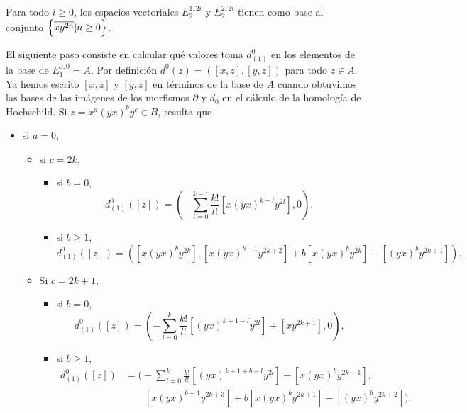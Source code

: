 \documentclass[fleqn,../tesis.tex]{subfiles}
\begin{document}
\begin{coro}
    Para todo $i \geq 0$, los espacios vectoriales $E_{2}^{1, 2i}$ y $E_{2}^{2, 2i}$ tienen como base
    al conjunto
       $\left\lbrace \overline{xy^{2n}} | n \geq 0 \right\rbrace$.
\end{coro}

El siguiente paso consiste en calcular qué valores toma $d_{(1)}^{0}$ en los elementos de la base de $E^{0, 0}_{1} = A$.
Por definición $d^{0}(z) = \left([x,z], [y,z]\right)$ para todo $z \in A$. Ya hemos escrito $[x, z]$ y $[y, z]$ en términos de la base de $A$
 cuando obtuvimos las bases de las imágenes de los morfismos $\partial$ y $d_0$ en el cálculo
de la homología de Hochschild. Si $z  = x^a(yx)^by^c\in B$, resulta que
\begin{itemize}
    \item si $a = 0$,
    \begin{itemize}
        \item si $c = 2k$,
        \begin{itemize}
            \item si $b = 0$,
            \[
                d^{0}_{(1)}([z]) = \left(-\sum_{l = 0}^{k -1}\frac{k!}{l!}\left[x(yx)^{k - l}y^{2l}\right], 0\right),
            \]
            \item si $b \geq 1$,
            \[
                d^0_{(1)}([z]) = \left(\left[x(yx)^by^{2k}\right],\left[x(yx)^{b - 1}y^{2k + 2}\right]
                    + b\left[x(yx)^{b}y^{2k}\right] - \left[(yx)^{b}y^{2k + 1}\right]\right).
            \]
        \end{itemize}
        \item Si $c = 2k + 1$,
        \begin{itemize}
            \item si $b = 0$,
            \[
                d^{0}_{(1)}([z]) = \left(-\sum_{l = 0}^{k}\frac{k!}{l!}\left[(yx)^{k + 1 - l}y^{2l}\right] + \left[xy^{2k + 1}\right], 0\right),
            \]
            \item si $b \geq 1$,
            \begin{align*}
                d^{0}_{(1)}([z]) &= \Bigg(-\sum_{l = 0}^{k}\frac{k!}{l!}\left[(yx)^{k + 1 + b - l}y^{2l}\right]
                    + \left[x(yx)^{b}y^{2k + 1}\right],\\
                &\qquad \left[x(yx)^{b - 1}y^{2k + 3}\right]
                    + b\left[x(yx)^{b}y^{2k + 1}\right] - \left[(yx)^{b}y^{2k + 2}\right]\Bigg).
            \end{align*}
        \end{itemize}

\end{itemize}
\end{itemize}
\end{document}
